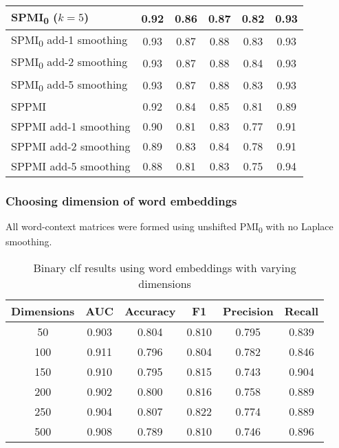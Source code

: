 \documentclass{article}
\begin{document}
\begin{table}[htp]
\begin{tabular}{|l|c|c|c|c|c|}
    \hline
    SPMI\textsubscript{0} ($k=5$) & 0.92 & 0.86 & 0.87 & 0.82 & 0.93 \\
    \hline
    SPMI\textsubscript{0} add-1 smoothing & \cellcolor{green} 0.93 & \cellcolor{green} 0.87 & \cellcolor{green} 0.88 & 0.83 & 0.93 \\
    \hline
    \cellcolor{green} SPMI\textsubscript{0} add-2 smoothing & \cellcolor{green} 0.93 & \cellcolor{green} 0.87 & \cellcolor{green} 0.88 & \cellcolor{green} 0.84 & 0.93 \\
    \hline
    SPMI\textsubscript{0} add-5 smoothing & \cellcolor{green} 0.93 & \cellcolor{green} 0.87 & \cellcolor{green} 0.88 & 0.83 & 0.93 \\
    \hline
    SPPMI & 0.92 & 0.84 & 0.85 & 0.81 & 0.89 \\
    \hline
    SPPMI add-1 smoothing & 0.90 & 0.81 & 0.83 & 0.77 & 0.91 \\
    \hline
    SPPMI add-2 smoothing & 0.89 & 0.83 & 0.84 & 0.78 & 0.91 \\
    \hline
    SPPMI add-5 smoothing & 0.88 & 0.81 & 0.83 & 0.75 & \cellcolor{green} 0.94 \\
    \hline
  \end{tabular}
  \label{tab:wemb500}
\end{table}

\hypertarget{choosing-dimension-of-word-embeddings}{%
\subsubsection{Choosing dimension of word
embeddings}\label{choosing-dimension-of-word-embeddings}}

All word-context matrices were formed using unshifted
PMI\textsubscript{0} with no Laplace smoothing.

\begin{table}[htp]
 \caption{Binary clf results using word embeddings with varying dimensions}
  \centering
  \begin{tabular}{|c|c|c|c|c|c|}
    \hline
    \rowcolor{lightgray} \textbf{Dimensions} & \textbf{AUC} & \textbf{Accuracy} & \textbf{F1} & \textbf{Precision} & \textbf{Recall} \\
    \hline
    50 & 0.903 & 0.804 & 0.810 & \cellcolor{green} 0.795 & 0.839 \\
    \hline
    100 & \cellcolor{green} 0.911 & 0.796 & 0.804 & 0.782 & 0.846 \\
    \hline
    150 & 0.910 & 0.795 & 0.815 & 0.743 & \cellcolor{green} 0.904 \\
    \hline
    200 & 0.902 & 0.800 & 0.816 & 0.758 & 0.889 \\
    \hline
    \cellcolor{green} 250 & 0.904 & \cellcolor{green} 0.807 & \cellcolor{green} 0.822 & 0.774 & 0.889 \\
    \hline
    500 & 0.908 & 0.789 & 0.810 & 0.746 & 0.896 \\
    \hline
  \end{tabular}
  \label{tab:wedim}
\end{table}



\end{document}
